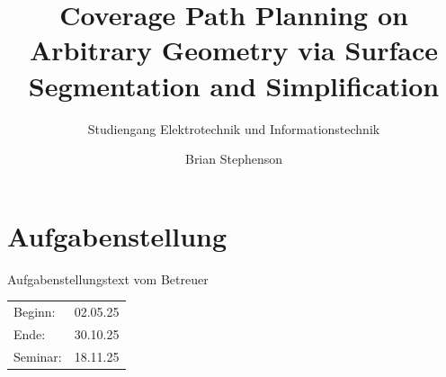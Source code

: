 \documentclass[
	ngerman,
	ruledheaders=section,%
	class=report,%
	thesis={type=master},%
	accentcolor=2c,%
	custommargins=true,%
	marginpar=false,%
	BCOR=0mm,%
	parskip=half-,%
	fontsize=11pt,%
	oneside,%
	numbers=noendperiod,
	fleqn,
]{tudapub}
\begin{document}

\title{Coverage Path Planning on Arbitrary Geometry via Surface Segmentation and Simplification}
\subtitle{\textmd{Studiengang Elektrotechnik und Informationstechnik}}
\author[B. Stephenson]{Brian Stephenson}%


\submissiondate{\today}



\frontmatter
\maketitle
\clearpage
\setcounter{page}{1}
\section*{Aufgabenstellung}

    Aufgabenstellungstext vom Betreuer

 \vspace{0.5cm}
\begin{tabular}{ll}
    Beginn: 	& 02.05.25 \\
    Ende: 		& 30.10.25 \\
    Seminar: 	& 18.11.25 \\
\end{tabular}
\clearpage
\end{document}
